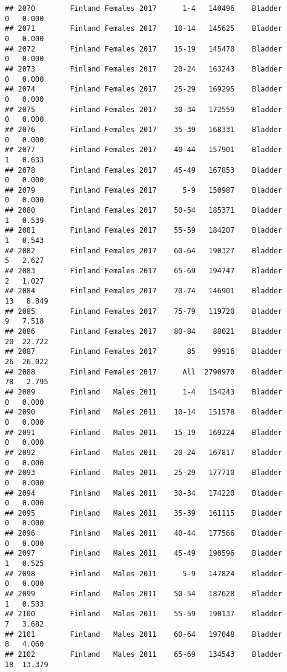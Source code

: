 \documentclass[
]{article}
\begin{document}
\begin{verbatim}
## 2070        Finland Females 2017      1-4   140496    Bladder      0   0.000
## 2071        Finland Females 2017    10-14   145625    Bladder      0   0.000
## 2072        Finland Females 2017    15-19   145470    Bladder      0   0.000
## 2073        Finland Females 2017    20-24   163243    Bladder      0   0.000
## 2074        Finland Females 2017    25-29   169295    Bladder      0   0.000
## 2075        Finland Females 2017    30-34   172559    Bladder      0   0.000
## 2076        Finland Females 2017    35-39   168331    Bladder      0   0.000
## 2077        Finland Females 2017    40-44   157901    Bladder      1   0.633
## 2078        Finland Females 2017    45-49   167853    Bladder      0   0.000
## 2079        Finland Females 2017      5-9   150987    Bladder      0   0.000
## 2080        Finland Females 2017    50-54   185371    Bladder      1   0.539
## 2081        Finland Females 2017    55-59   184207    Bladder      1   0.543
## 2082        Finland Females 2017    60-64   190327    Bladder      5   2.627
## 2083        Finland Females 2017    65-69   194747    Bladder      2   1.027
## 2084        Finland Females 2017    70-74   146901    Bladder     13   8.849
## 2085        Finland Females 2017    75-79   119720    Bladder      9   7.518
## 2086        Finland Females 2017    80-84    88021    Bladder     20  22.722
## 2087        Finland Females 2017       85    99916    Bladder     26  26.022
## 2088        Finland Females 2017      All  2790970    Bladder     78   2.795
## 2089        Finland   Males 2011      1-4   154243    Bladder      0   0.000
## 2090        Finland   Males 2011    10-14   151578    Bladder      0   0.000
## 2091        Finland   Males 2011    15-19   169224    Bladder      0   0.000
## 2092        Finland   Males 2011    20-24   167817    Bladder      0   0.000
## 2093        Finland   Males 2011    25-29   177710    Bladder      0   0.000
## 2094        Finland   Males 2011    30-34   174220    Bladder      0   0.000
## 2095        Finland   Males 2011    35-39   161115    Bladder      0   0.000
## 2096        Finland   Males 2011    40-44   177566    Bladder      0   0.000
## 2097        Finland   Males 2011    45-49   190596    Bladder      1   0.525
## 2098        Finland   Males 2011      5-9   147824    Bladder      0   0.000
## 2099        Finland   Males 2011    50-54   187628    Bladder      1   0.533
## 2100        Finland   Males 2011    55-59   190137    Bladder      7   3.682
## 2101        Finland   Males 2011    60-64   197048    Bladder      8   4.060
## 2102        Finland   Males 2011    65-69   134543    Bladder     18  13.379

\end{verbatim}
\end{document}
